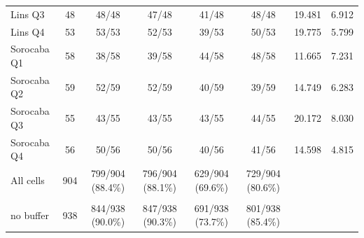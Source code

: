 \begin{tabular}{lccccccc}
Lins Q3 & 48 & 48/48 & 47/48 & 41/48 & 48/48 & 19.481 & 6.912 \\
Lins Q4 & 53 & 53/53 & 52/53 & 39/53 & 50/53 & 19.775 & 5.799 \\
Sorocaba Q1 & 58 & 38/58 & 39/58 & 44/58 & 48/58 & 11.665 & 7.231 \\
Sorocaba Q2 & 59 & 52/59 & 52/59 & 40/59 & 39/59 & 14.749 & 6.283 \\
Sorocaba Q3 & 55 & 43/55 & 43/55 & 43/55 & 44/55 & 20.172 & 8.030 \\
Sorocaba Q4 & 56 & 50/56 & 50/56 & 40/56 & 41/56 & 14.598 & 4.815 \\
\midrule
All cells & 904 & 799/904 (88.4\%) & 796/904 (88.1\%) & 629/904 (69.6\%) & 729/904 (80.6\%) & & \\
\celula{All cells, \\ \relax no buffer} & 938 & 844/938 (90.0\%) & 847/938 (90.3\%) & 691/938 (73.7\%) & 801/938 (85.4\%) & & \\
\bottomrule
\end{tabular}
